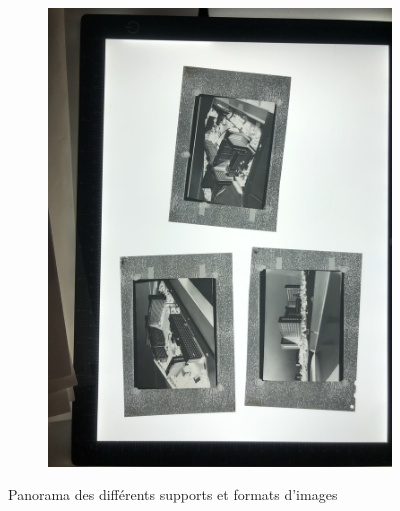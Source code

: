 \begin{figure}[H]
\begin{subfigure}{0.24\textwidth}
        \includegraphics[width=\linewidth]{Illustrations/P12.jpg}
        \caption{}
    \end{subfigure}    
    \caption{Panorama des différents supports et formats d'images}
    \label{fig:pellicules}
\end{figure}    

